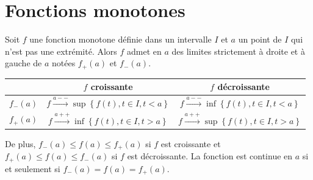 \section{Fonctions monotones}
 
\begin{prop}
 Soit $f$ une fonction monotone définie dans un intervalle $I$ et $a$ un point de $I$ qui n'est pas une extrémité. Alors $f$ admet en $a$ des limites strictement à droite et à gauche de $a$ notées $f_+(a)$ et $f_-(a)$.
\renewcommand{\arraystretch}{1.5}
\begin{center}
\begin{tabular}{c | c || c}
&$f$ croissante                                                         &  $f$ décroissante\\ \hline 
$f_-(a)$&$f\xrightarrow{a--} \sup\left\lbrace f(t), t\in I, t<a \right\rbrace $ & $f\xrightarrow{a--} \inf\left\lbrace f(t), t\in I, t<a \right\rbrace $\\  \hline
$f_+(a)$&$f\xrightarrow{a++} \inf\left\lbrace f(t), t\in I, t>a \right\rbrace $ & $f\xrightarrow{a++} \sup\left\lbrace f(t), t\in I, t>a \right\rbrace $\\  \hline
\end{tabular}
\end{center}
De plus, $f_-(a)\leq f(a) \leq f_+(a)$ si $f$ est croissante et $f_+(a)\leq f(a) \leq f_-(a)$ si $f$ est décroissante. La fonction est continue en $a$ si et seulement si $f_-(a)= f(a) = f_+(a)$.
\end{prop}
